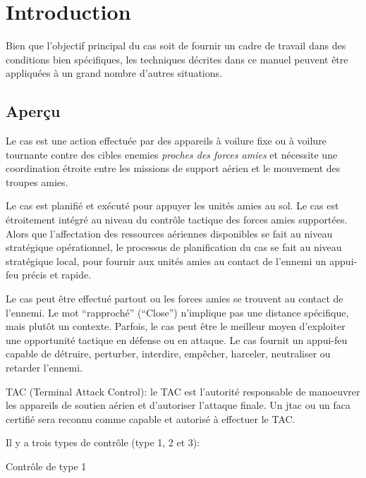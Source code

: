 \newpage

\sloppy

\chapter{Introduction}

\begin{center}
\end{center}

\begin{notebox}
Bien que l’objectif principal du \acrshort{cas} soit de fournir un cadre de travail dans des conditions bien spécifiques, les techniques décrites dans ce manuel peuvent être appliquées à un grand nombre d’autres situations.%
\end{notebox}

\section{Aperçu}

\e

    \item
    Le \acrfull{cas} est une action effectuée par des appareils à voilure fixe ou à voilure tournante contre des cibles enemies \emph{proches des forces amies} et nécessite une coordination étroite entre les missions de support aérien et le mouvement des troupes amies.
    \item
    Le \acrshort{cas} est planifié et exécuté pour appuyer les unités amies au sol. Le \acrshort{cas} est étroitement intégré au niveau du contrôle tactique des forces amies supportées. Alors que l’affectation des ressources aériennes disponibles se fait au niveau stratégique opérationnel, le processus de planification du \acrshort{cas} se fait au niveau stratégique local, pour fournir aux unités amies au contact de l’ennemi un appui-feu précis et rapide.
    \item
    Le \acrshort{cas} peut être effectué partout ou les forces amies se trouvent au contact de l’ennemi. Le mot ``rapproché'' (``Close'') n’implique pas une distance spécifique, mais plutôt un contexte. Parfois, le \acrshort{cas} peut être le meilleur moyen d’exploiter une opportunité tactique en défense ou en attaque. Le \acrshort{cas} fournit un appui-feu capable de détruire, perturber, interdire, empêcher, harceler, neutraliser ou retarder l’ennemi.
    \item
    TAC (Terminal Attack Control): le TAC est l’autorité responsable de manoeuvrer les appareils de soutien aérien et d’autoriser l’attaque finale. Un \acrshort{jtac} ou un \acrshort{faca} certifié sera reconnu comme capable et autorisé à effectuer le TAC.
    \item
    Il y a trois types de contrôle (type 1, 2 et 3):
    \ee
        \item
        Contrôle de type 1

